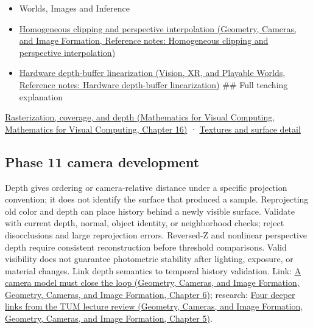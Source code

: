\begin{itemize}
\item
  {Worlds, Images and Inference}
\item
  \href{../03-Geometry-Cameras-and-Image-Formation/main.pdf\#nameddest=appendix-40426e4b2103}{Homogeneous clipping and perspective interpolation (Geometry, Cameras, and Image Formation, Reference notes: Homogeneous clipping and perspective interpolation)}
\item
  \href{../07-Vision-XR-and-Playable-Worlds/main.pdf\#nameddest=appendix-1bc40b08db4a}{Hardware depth-buffer linearization (Vision, XR, and Playable Worlds, Reference notes: Hardware depth-buffer linearization)} \#\# Full teaching explanation
\end{itemize}

\href{../02-Mathematics-for-Visual-Computing/main.pdf\#nameddest=03-visual-computing-i-ch012-rasterization-coverage-and-depth}{Rasterization, coverage, and depth (Mathematics for Visual Computing, Mathematics for Visual Computing, Chapter 16)} · \hyperref[03-visual-computing-i-ch019-textures-and-surface-detail]{Textures and surface detail}

\subsection{Phase 11 camera development}\label{appendix-97578ed97952-phase-11-camera-development}

Depth gives ordering or camera-relative distance under a specific projection convention; it does not identify the surface that produced a sample. Reprojecting old color and depth can place history behind a newly visible surface. Validate with current depth, normal, object identity, or neighborhood checks; reject disocclusions and large reprojection errors. Reversed-Z and nonlinear perspective depth require consistent reconstruction before threshold comparisons. Valid visibility does not guarantee photometric stability after lighting, exposure, or material changes. Link depth semantics to temporal history validation. Link: \href{../03-Geometry-Cameras-and-Image-Formation/main.pdf\#nameddest=02-foundations-ii-ch037-a-camera-model-must-close-the-loop}{A camera model must close the loop (Geometry, Cameras, and Image Formation, Geometry, Cameras, and Image Formation, Chapter 6)}; research: \href{../03-Geometry-Cameras-and-Image-Formation/main.pdf\#nameddest=02-foundations-ii-ch036-four-deeper-links-from-the-tum-lecture-review}{Four deeper links from the TUM lecture review (Geometry, Cameras, and Image Formation, Geometry, Cameras, and Image Formation, Chapter 5)}.
